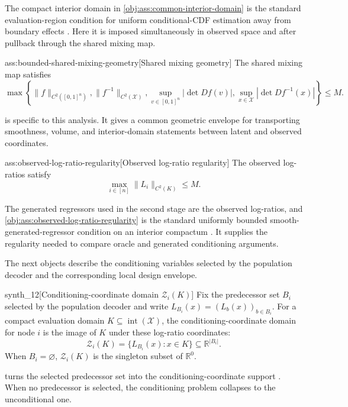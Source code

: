 \documentclass[11pt]{article}
\begin{document}
The compact interior domain in \cref{obj:ass:common-interior-domain} is the standard evaluation-region condition for uniform conditional-CDF estimation away from boundary effects \citep{Xie2023UniformConditionalCDF}. Here it is imposed simultaneously in observed space and after pullback through the shared mixing map.

\begin{assumptionv}{ass:bounded-shared-mixing-geometry}[Shared mixing geometry]
The shared mixing map satisfies
\[
\max\left\{
\|f\|_{C^2([0,1]^n)},
\|f^{-1}\|_{C^2(\mathcal X)},
\sup_{v\in[0,1]^n}|\det Df(v)|,
\sup_{x\in\mathcal X}|\det Df^{-1}(x)|
\right\}\le M.
\]
\end{assumptionv}

 is specific to this analysis. It gives a common geometric envelope for transporting smoothness, volume, and interior-domain statements between latent and observed coordinates.

\begin{assumptionv}{ass:observed-log-ratio-regularity}[Observed log-ratio regularity]
The observed log-ratios satisfy
\[
\max_{i\in[n]}\|L_i\|_{C^2(K)}\le M.
\]
\end{assumptionv}

The generated regressors used in the second stage are the observed log-ratios, and \cref{obj:ass:observed-log-ratio-regularity} is the standard uniformly bounded smooth-generated-regressor condition on an interior compactum \citep{MammenRotheSchienle2012GeneratedCovariates}. It supplies the regularity needed to compare oracle and generated conditioning arguments.

The next objects describe the conditioning variables selected by the population decoder and the corresponding local design envelope.

\begin{definitionv}{synth_12}[Conditioning-coordinate domain \(\mathcal Z_i(K)\)]
Fix the predecessor set \(B_i\) selected by the population decoder and write \(L_{B_i}(x)=(L_b(x))_{b\in B_i}\). For a compact evaluation domain \(K\subseteq\operatorname{int}(\mathcal X)\), the conditioning-coordinate domain for node \(i\) is the image of \(K\) under these log-ratio coordinates:
\[
\mathcal Z_i(K)=\{L_{B_i}(x):x\in K\}\subseteq\mathbb R^{|B_i|}.
\]
When \(B_i=\varnothing\), \(\mathcal Z_i(K)\) is the singleton subset of \(\mathbb R^0\).
\end{definitionv}

 turns the selected predecessor set  into the conditioning-coordinate support . When no predecessor is selected, the conditioning problem collapses to the unconditional one.
\end{document}
